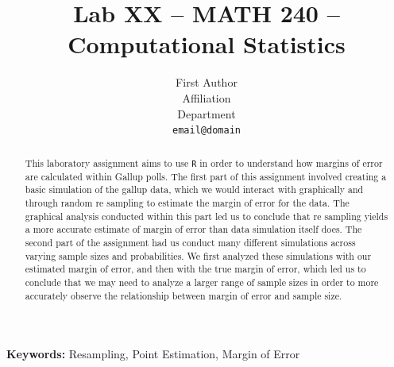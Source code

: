 \documentclass{article}\usepackage[]{graphicx}\usepackage[]{xcolor}
\begin{document}
\vspace{-1in}
\title{Lab XX -- MATH 240 -- Computational Statistics}

\author{
  First Author \\
  Affiliation  \\
  Department  \\
  {\tt email@domain}
}

\date{}

\maketitle

\begin{multicols}{2}
\begin{abstract}
This laboratory assignment aims to use \texttt{R} in order to understand how margins of error are calculated within Gallup polls. The first part of this assignment involved creating a basic simulation of the gallup data, which we would interact with graphically and through random re sampling to estimate the margin of error for the data. The graphical analysis conducted within this part led us to conclude that re sampling yields a more accurate estimate of margin of error than data simulation itself does. The second part of the assignment had us conduct many different simulations across varying sample sizes and probabilities. We first analyzed these simulations with our estimated margin of error, and then with the true margin of error, which led us to conclude that we may need to analyze a larger range of sample sizes in order to more accurately observe the relationship between margin of error and sample size.
\end{abstract}

\noindent \textbf{Keywords:} Resampling, Point Estimation, Margin of Error


\end{multicols}
\end{document}
